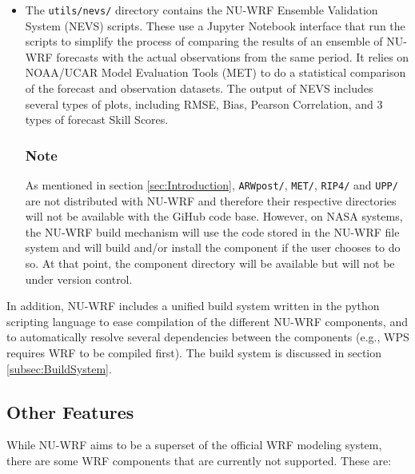 \begin{itemize}
\item The \texttt{utils/nevs/} directory contains the NU-WRF Ensemble Validation System (NEVS) 
scripts. These use a Jupyter Notebook interface that run the scripts to simplify the process of 
comparing the results of an ensemble of NU-WRF forecasts with the actual observations from 
the same period. It relies on NOAA/UCAR Model Evaluation Tools (MET) to do a statistical 
comparison of the forecast and observation datasets. The output of NEVS includes several 
types of plots, including RMSE, Bias, Pearson Correlation, and 3 types of forecast Skill Scores.

\subsubsection{Note}
As mentioned in section \ref{sec:Introduction}, \texttt{ARWpost/}, \texttt{MET/}, \texttt{RIP4/} and \texttt{UPP/}  are not distributed with NU-WRF and therefore their respective directories will not be available with the GiHub code base. However, on NASA systems, the NU-WRF build mechanism will use the code stored in the NU-WRF file system and will build and/or install the component if the user chooses to do so.  At that point, the component directory will be available but will not be under version control.

\end{itemize}

In addition, NU-WRF includes a unified build system written in the python 
scripting language to ease compilation of the different NU-WRF components, 
and to automatically resolve several dependencies between the components 
(e.g., WPS requires WRF to be compiled first). The build system is discussed
in section \ref{subsec:BuildSystem}.

\subsection{Other Features}

While NU-WRF aims to be a superset of the official WRF modeling system,
there are some WRF components that are currently not supported. These are:

